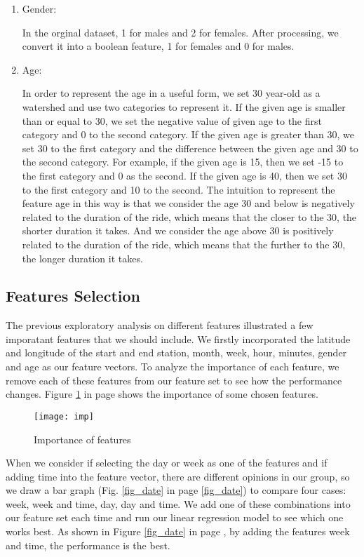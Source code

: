 \begin{enumerate}
	\item Gender:
	\par In the orginal dataset, 1 for males and 2 for females. After processing, we convert it into a boolean feature, 1 for females and 0 for males.
	\item Age:
	\par In order to represent the age in a useful form, we set 30 year-old as a watershed and use two categories to represent it. If the given age is smaller than or equal to 30, we set the negative value of given age to the first category and 0 to the second category. If the given age is greater than 30, we set 30 to the first category and the difference between the given age and 30 to the second category. For example, if the given age is 15, then we set -15 to the first category and 0 as the second. If the given age is 40, then we set 30 to the first category and 10 to the second. The intuition to represent the feature age in this way is that we consider the age 30 and below is negatively related to the duration of the ride, which means that the closer to the 30, the shorter duration it takes. And we consider the age above 30 is positively related to the duration of the ride, which means that the further to the 30, the longer duration it takes.  

\end{enumerate}


\subsection{Features Selection}
The previous exploratory analysis on different features illustrated a few imporatant features that we should include. We firstly incorporated the latitude and longitude of the start and end station, month, week, hour, minutes, gender and age as our feature vectors. To analyze the importance of each feature, we remove each of these features from our feature set to see how the performance changes. Figure \ref{fig_imp} in page \pageref{fig_imp} shows the importance of some chosen features. 

  \begin{figure}[h!]
  \centering
  \texttt{[image: imp]}
  \caption{Importance of features}
  \label{fig_imp}
  \end{figure}


\par When we consider if selecting the day or week as one of the features and if adding time into the feature vector, there are different opinions in our group, so we draw a bar graph (Fig. \ref{fig_date} in page \ref{fig_date}) to compare four cases: week, week and time, day, day and time. We add one of these combinations into our feature set each time and run our linear regression model to see which one works best. As shown in Figure \ref{fig_date} in page \pageref{fig_date}, by adding the features week and time, the performance is the best. 


